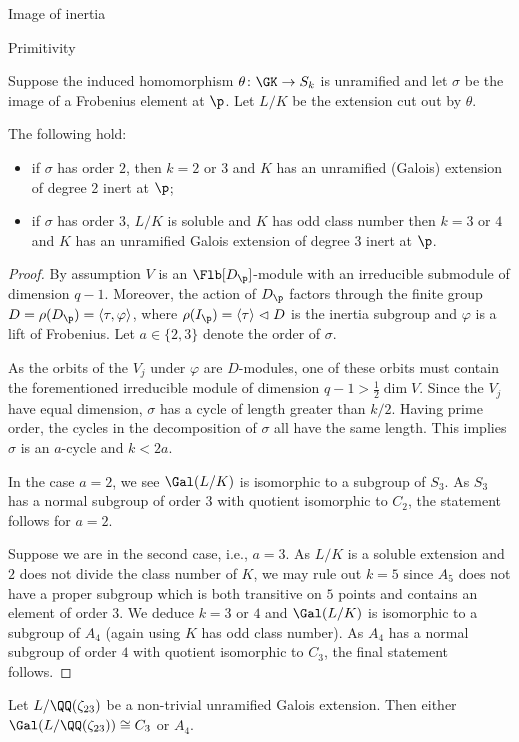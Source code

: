 \documentclass[11pt,a4paper]{article}
\begin{document}
\begin{section}{Image of inertia}
\begin{subsection}{Primitivity}
\begin{lemma}
Suppose the induced homomorphism $\theta\colon \GK \rightarrow S_k$ is unramified and let $\sigma$ be the image of a Frobenius element at $\p$. Let $L/K$ be the extension cut out by $\theta$.

The following hold:
\begin{itemize}
    \item if $\sigma$ has order $2$, then $k=2$ or $3$ and $K$ has an unramified (Galois) extension of degree 2 inert at $\p$;
    \item if $\sigma$ has order $3$, $L/K$ is soluble and $K$ has odd class number then $k=3$ or $4$ and $K$ has an unramified Galois extension of degree $3$ inert at $\p$.
\end{itemize}
\end{lemma}

\begin{proof}
By assumption $V$ is an $\Flb[D_\p]$-module with an irreducible submodule of dimension $q-1$.
Moreover, the action of $D_\p$ factors through the finite group $D = \rho(D_\p) = \langle \tau , \varphi \rangle$, where $\rho(I_\p) = \langle \tau \rangle \vartriangleleft D$ is the inertia subgroup and $\varphi$ is a lift of Frobenius.
Let $a \in \{2,3\}$ denote the order of $\sigma$.

As the orbits of the $V_j$ under $\varphi$ are $D$-modules, one of these orbits must contain the forementioned irreducible module of dimension $q-1>\frac{1}{2}\dim V$.
Since the $V_j$ have equal dimension, $\sigma$ has a cycle of length greater than $k/2$.
Having prime order, the cycles in the decomposition of $\sigma$ all have the same length. 
This implies $\sigma$ is an $a$-cycle and $k<2a$.

In the case $a=2$, we see $\Gal(L/K)$ is isomorphic to a subgroup of $S_3$. As $S_3$ has a normal subgroup of order $3$ with quotient isomorphic to $C_2$, the statement follows for $a=2$.

Suppose we are in the second case, i.e., $a=3$.
As $L/K$ is a soluble extension and $2$ does not divide the class number of $K$, we may rule out $k=5$ since $A_5$ does not have a proper subgroup which is both transitive on $5$ points and contains an element of order $3$.
We deduce $k=3$ or $4$ and $\Gal(L/K)$ is isomorphic to a subgroup of $A_4$ (again using $K$ has odd class number).
As $A_4$ has a normal subgroup of order $4$ with quotient isomorphic to $C_3$, the final statement follows.
\end{proof}

\begin{lemma}
\label{lemma_primitivity_unramified_extns_of_23}
Let $L/\QQ(\zeta_{23})$ be a non-trivial unramified Galois extension. Then either $\Gal(L/\QQ(\zeta_{23})) \cong C_3$ or $ A_4$.
\end{lemma}


\end{subsection}
\end{section}
\end{document}
